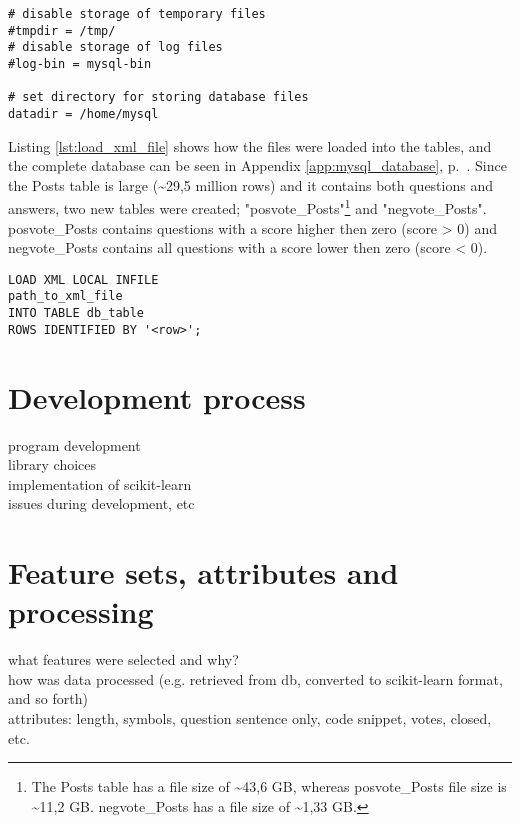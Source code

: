 \begin{lstlisting}[caption={Changes made to config file: /etc/mysql/my.cnf}, label={lst:mariadb_config_file}] 
# disable storage of temporary files
#tmpdir = /tmp/		  
# disable storage of log files
#log-bin = mysql-bin  

# set directory for storing database files
datadir = /home/mysql 
\end{lstlisting}

Listing \ref{lst:load_xml_file} shows how the files were loaded into the tables, and the complete database can 
be seen in Appendix \ref{app:mysql_database}, p.~\pageref{app:mysql_database}. Since the Posts table is large 
(\textasciitilde 29,5 million rows) and it contains both questions and answers, two new tables were created; 
"posvote\_Posts"\footnote{The Posts table has a file size of \textasciitilde 43,6 GB, whereas posvote\_Posts file 
	size is \textasciitilde 11,2 GB. negvote\_Posts has a file size of \textasciitilde 1,33 GB.} and 
"negvote\_Posts". posvote\_Posts contains questions with a score higher then zero (score > 0) and negvote\_Posts 
contains all questions with a score lower then zero (score < 0).

\begin{lstlisting}[caption={Load XML file into a table in the MySQL database}, label={lst:load_xml_file}] 
LOAD XML LOCAL INFILE 
path_to_xml_file
INTO TABLE db_table
ROWS IDENTIFIED BY '<row>';
\end{lstlisting}

\section{Development process} 
\label{sec:libsvm_implementation}
program development \\
library choices \\
implementation of scikit-learn \\
issues during development, etc


\section{Feature sets, attributes and processing}
\label{sec:feature_sets}
what features were selected and why? \\
how was data processed (e.g. retrieved from db, converted to scikit-learn format, and so forth) \\
attributes: length, symbols, question sentence only, code snippet, votes, closed, etc.


